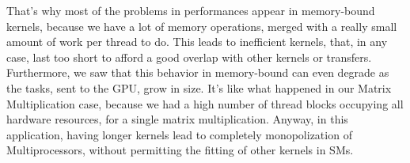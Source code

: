  That's why most of the problems in performances appear in memory-bound kernels, because we have a lot of memory operations, merged with a really small amount of work per thread to do. This leads to inefficient kernels, that, in any case, last too short to afford a good overlap with other kernels or transfers.\\
 Furthermore, we saw that this behavior in memory-bound can even degrade as the tasks, sent to the GPU, grow in size. It's like what happened in our Matrix Multiplication case, because we had a high number of thread blocks occupying all hardware resources, for a single matrix multiplication. Anyway, in this application, having longer kernels lead to completely monopolization of Multiprocessors, without permitting the fitting of other kernels in SMs. \\
 
 


